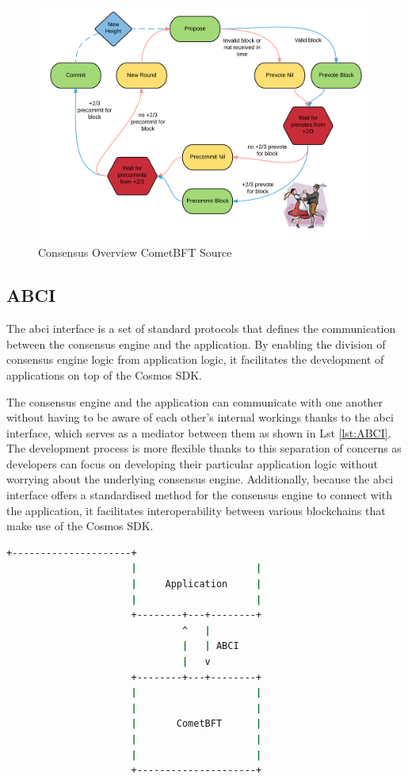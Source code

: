 \begin{figure}[H]
    \centering
    \includegraphics[width=\textwidth]{figures/cometbft.png}
    \caption{Consensus Overview CometBFT Source\cite{cometbft-overview}}
    \label{fig:cometbft-overview}
\end{figure}


\subsection{ABCI}
The \gls{abci} interface is a set of standard protocols that defines the communication between the consensus engine and the application. By enabling the division of consensus engine logic from application logic, it facilitates the development of applications on top of the Cosmos SDK.

The consensus engine and the application can communicate with one another without having to be aware of each other's internal workings thanks to the \gls{abci} interface, which serves as a mediator between them as shown in Lst \ref{lst:ABCI}. The development process is more flexible thanks to this separation of concerns as developers can focus on developing their particular application logic without worrying about the underlying consensus engine. Additionally, because the \gls{abci} interface offers a standardised method for the consensus engine to connect with the application, it facilitates interoperability between various blockchains that make use of the Cosmos SDK.

\newpage
\begin{lstlisting}[language=bash, caption=ABCI Interface. Source:\cite{app-based-blockchain},label={lst:ABCI}]
                      +---------------------+
                      |                     |
                      |     Application     |
                      |                     |
                      +--------+---+--------+
                               ^   |
                               |   | ABCI
                               |   v
                      +--------+---+--------+
                      |                     |
                      |                     |
                      |       CometBFT      |
                      |                     |
                      |                     |
                      +---------------------+
\end{lstlisting}


